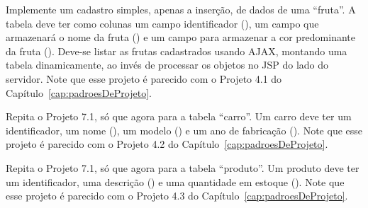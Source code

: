 \begin{projetoSemArquivo}{}{}{}
    Implemente um cadastro simples, apenas a inserção, de dados de uma ``fruta''. A tabela deve ter como colunas um campo identificador (), um campo que armazenará o nome da fruta () e um campo para armazenar a cor predominante da fruta (). Deve-se listar as frutas cadastrados usando AJAX, montando uma tabela dinamicamente, ao invés de processar os objetos no JSP do lado do servidor. Note que esse projeto é parecido com o Projeto 4.1 do Capítulo~\ref{cap:padroesDeProjeto}.
\end{projetoSemArquivo}

\begin{projetoSemArquivo}{}{}{}
    Repita o Projeto 7.1, só que agora para a tabela ``carro''. Um carro deve ter um identificador, um nome (), um modelo () e um ano de fabricação (). Note que esse projeto é parecido com o Projeto 4.2 do Capítulo~\ref{cap:padroesDeProjeto}.
\end{projetoSemArquivo}

\begin{projetoSemArquivo}{}{}{}
    Repita o Projeto 7.1, só que agora para a tabela ``produto''. Um produto deve ter um identificador, uma descrição () e uma quantidade em estoque (). Note que esse projeto é parecido com o Projeto 4.3 do Capítulo~\ref{cap:padroesDeProjeto}.
\end{projetoSemArquivo}